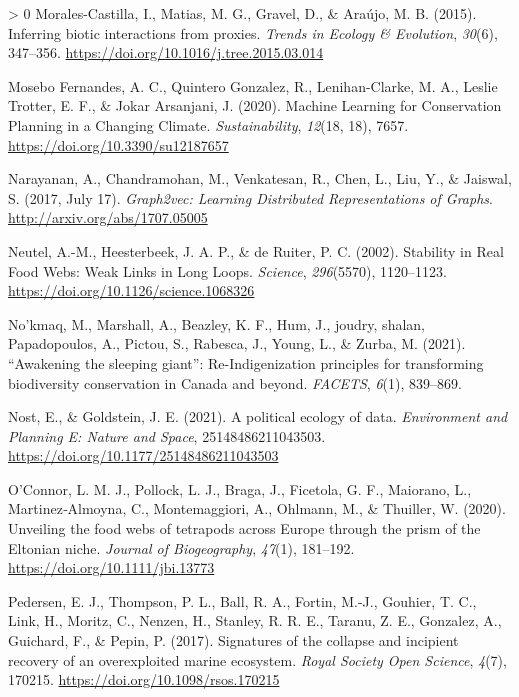 \documentclass[10pt,oneside]{article}
\newlength{\cslhangindent}
\newenvironment{CSLReferences}[3] %
 {%
  \setlength{\parindent}{0pt}
  \ifodd #1 \everypar{\setlength{\hangindent}{\cslhangindent}}\ignorespaces\fi
  \ifnum #2 > 0
  \setlength{\parskip}{#2\baselineskip}
  \fi
 }%
 {}
\begin{document}
\begin{CSLReferences}{1}{0}
\leavevmode\hypertarget{ref-Morales-Castilla2015InfBio}{}%
Morales-Castilla, I., Matias, M. G., Gravel, D., \& Araújo, M. B.
(2015). Inferring biotic interactions from proxies. \emph{Trends in
Ecology \& Evolution}, \emph{30}(6), 347--356.
\url{https://doi.org/10.1016/j.tree.2015.03.014}

\leavevmode\hypertarget{ref-MoseboFernandes2020MacLea}{}%
Mosebo Fernandes, A. C., Quintero Gonzalez, R., Lenihan-Clarke, M. A.,
Leslie Trotter, E. F., \& Jokar Arsanjani, J. (2020). Machine Learning
for Conservation Planning in a Changing Climate. \emph{Sustainability},
\emph{12}(18, 18), 7657. \url{https://doi.org/10.3390/su12187657}

\leavevmode\hypertarget{ref-Narayanan2017GraLea}{}%
Narayanan, A., Chandramohan, M., Venkatesan, R., Chen, L., Liu, Y., \&
Jaiswal, S. (2017, July 17). \emph{Graph2vec: Learning Distributed
Representations of Graphs}. \url{http://arxiv.org/abs/1707.05005}

\leavevmode\hypertarget{ref-Neutel2002StaRea}{}%
Neutel, A.-M., Heesterbeek, J. A. P., \& de Ruiter, P. C. (2002).
Stability in Real Food Webs: Weak Links in Long Loops. \emph{Science},
\emph{296}(5570), 1120--1123.
\url{https://doi.org/10.1126/science.1068326}

\leavevmode\hypertarget{ref-Nokmaq2021AwaSle}{}%
No'kmaq, M., Marshall, A., Beazley, K. F., Hum, J., joudry, shalan,
Papadopoulos, A., Pictou, S., Rabesca, J., Young, L., \& Zurba, M.
(2021). {``Awakening the sleeping giant''}: Re-Indigenization principles
for transforming biodiversity conservation in Canada and beyond.
\emph{FACETS}, \emph{6}(1), 839--869.

\leavevmode\hypertarget{ref-Nost2021PolEco}{}%
Nost, E., \& Goldstein, J. E. (2021). A political ecology of data.
\emph{Environment and Planning E: Nature and Space}, 25148486211043503.
\url{https://doi.org/10.1177/25148486211043503}

\leavevmode\hypertarget{ref-OConnor2020UnvFoo}{}%
O'Connor, L. M. J., Pollock, L. J., Braga, J., Ficetola, G. F.,
Maiorano, L., Martinez‐Almoyna, C., Montemaggiori, A., Ohlmann, M., \&
Thuiller, W. (2020). Unveiling the food webs of tetrapods across Europe
through the prism of the Eltonian niche. \emph{Journal of Biogeography},
\emph{47}(1), 181--192. \url{https://doi.org/10.1111/jbi.13773}

\leavevmode\hypertarget{ref-Pedersen2017SigCol}{}%
Pedersen, E. J., Thompson, P. L., Ball, R. A., Fortin, M.-J., Gouhier,
T. C., Link, H., Moritz, C., Nenzen, H., Stanley, R. R. E., Taranu, Z.
E., Gonzalez, A., Guichard, F., \& Pepin, P. (2017). Signatures of the
collapse and incipient recovery of an overexploited marine ecosystem.
\emph{Royal Society Open Science}, \emph{4}(7), 170215.
\url{https://doi.org/10.1098/rsos.170215}


\end{CSLReferences}
\end{document}

